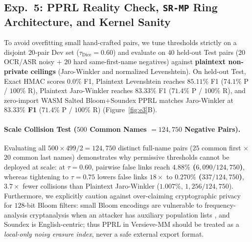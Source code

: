 \documentclass{article}
\begin{document}
\subsection{Exp.~5: PPRL Reality Check, \texttt{SR-MP} Ring Architecture, and Kernel Sanity}
\label{sec:exp5}

To avoid overfitting small hand-crafted pairs, we tune thresholds strictly on a disjoint $20$-pair Dev set ($\tau_{\text{Dice}}{=}0.60$) and evaluate on $40$ held-out Test pairs ($20$ OCR/ASR noisy + $20$ hard same-first-name negatives) against \textbf{plaintext non-private ceilings} (Jaro-Winkler and normalized Levenshtein). On held-out Test, Exact HMAC scores $0.0\%$ F1, Plaintext Levenshtein reaches $85.11\%$ F1 ($74.1\%$ P / $100\%$ R), Plaintext Jaro-Winkler reaches $83.33\%$ F1 ($71.4\%$ P / $100\%$ R), and zero-import WASM Salted Bloom+Soundex PPRL matches Jaro-Winkler at \textbf{$83.33\%$ F1} ($71.4\%$ P / $100\%$ R) (Figure~\ref{fig:e3}B).

\paragraph{Scale Collision Test ($500$ Common Names $= 124{,}750$ Negative Pairs).}
Evaluating all $500 \times 499 / 2 = 124{,}750$ distinct full-name pairs ($25$ common first $\times$ $20$ common last names) demonstrates why permissive thresholds cannot be deployed at scale: at $\tau{=}0.60$, pairwise false links reach \textbf{$4.88\%$ ($6{,}090/124{,}750$)}, whereas tightening to $\tau{=}0.75$ lowers false links $18\times$ to \textbf{$0.270\%$ ($337/124{,}750$)}, $3.7\times$ fewer collisions than Plaintext Jaro-Winkler ($1.007\%$, $1{,}256/124{,}750$). Furthermore, we explicitly caution against over-claiming cryptographic privacy for $128$-bit Bloom filters: small Bloom encodings are vulnerable to frequency-analysis cryptanalysis when an attacker has auxiliary population lists \citep{christen2018bloomattack}, and Soundex is English-centric; thus PPRL in Versieve-MM should be treated as a \emph{local-only noisy erasure index}, never a safe external export format.
\end{document}
